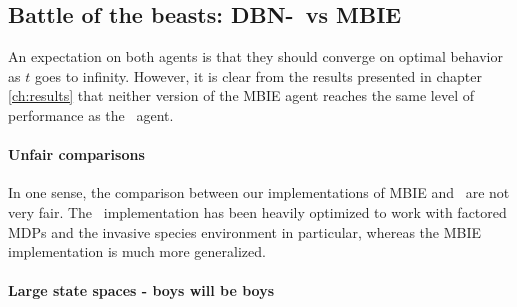 \subsection{Battle of the beasts: DBN-\etre\ vs MBIE }

An expectation on both agents is that they should converge on optimal behavior as $t$ goes to infinity. However, it is clear from the results presented in chapter \ref{ch:results} that neither version of the MBIE agent reaches the same level of performance as the \etre\ agent. 

\paragraph{Unfair comparisons} In one sense, the comparison between our implementations of MBIE and \etre\ are not very fair. The \etre\ implementation has been heavily optimized to work with factored MDPs and the invasive species environment in particular, whereas the MBIE implementation is much more generalized. \parencite{strehl2004empirical}  

\paragraph{Large state spaces - boys will be boys}


